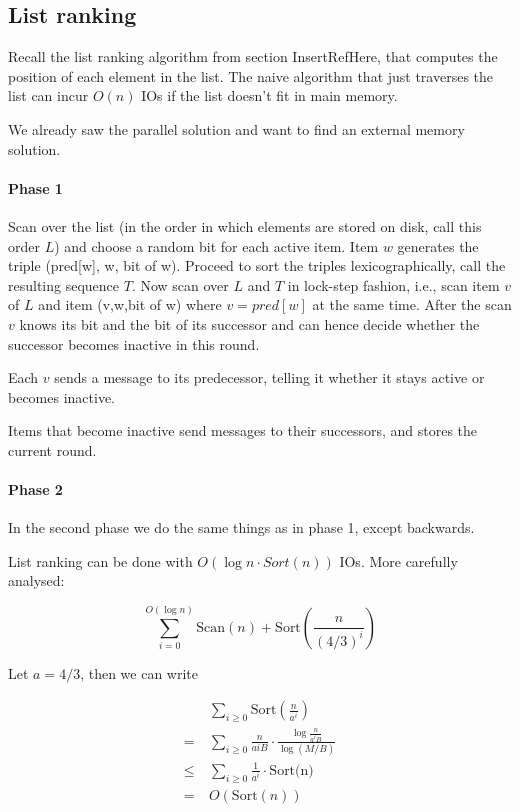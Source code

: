 \subsection{List ranking}

Recall the list ranking algorithm from section InsertRefHere, that computes the position of each element in the list. The naive algorithm that just traverses the list can incur $O(n)$ IOs if the list doesn't fit in main memory. 

We already saw the parallel solution and want to find an external memory solution.

\paragraph{Phase 1} Scan over the list (in the order in which elements are stored on disk, call this order $L$) and choose a random bit for each active item. Item $w$ generates the triple (pred[w], w, bit of w). Proceed to sort the triples lexicographically, call the resulting sequence $T$. Now scan over $L$ and $T$ in lock-step fashion, i.e., scan item $v$ of $L$ and item (v,w,bit of w) where $v=pred[w]$ at the same time. After the scan $v$ knows its bit and the bit of its successor and can hence decide whether the successor becomes inactive in this round.

Each $v$ sends a message to its predecessor, telling it whether it stays active or becomes inactive.

Items that become inactive send messages to their successors, and stores the current round.

\paragraph{Phase 2} In the second phase we do the same things as in phase 1, except backwards.

\begin{lem} List ranking can be done with $O(\log n \cdot Sort(n))$ IOs. More carefully analysed:

\[\sum_{i=0}^{O(\log n)} \text{Scan}(n) + \text{Sort}\left(\frac{n}{(4/3)^i}\right)\]
\end{lem}

Let $a=4/3$, then we can write

\begin{align*}
\quad &\sum_{i\geq 0}\text{Sort}\left(\frac{n}{a^i}\right)\\
=& \sum_{i\geq 0} \frac{n}{aiB}\cdot \frac{\log \frac{n}{a^iB}}{\log (M/B)}\\
\leq & \sum_{i\geq 0} \frac{1}{a^i} \cdot \text{Sort(n)}\\
=& O(\text{Sort}(n))
\end{align*}

